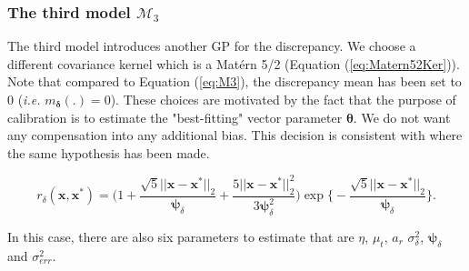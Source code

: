 \documentclass[soumission]{jsfds}
\begin{document}
\subsubsection{The third model $\mathcal{M}_3$}

The third model introduces another GP for the discrepancy. We choose a different covariance kernel which is a Matérn 5/2 (Equation (\ref{eq:Matern52Ker})).
Note that compared to Equation (\ref{eq:M3}), the discrepancy mean has been set to $0$ (\textit{i.e.} $m_{\boldsymbol{\delta}}(.)=0$). These choices are motivated by the fact that the purpose of calibration is to estimate the "best-fitting" 
vector parameter $\boldsymbol{\theta}$. We do not want any compensation into any additional bias. This decision is consistent with \citet{bachoc2014} where the same hypothesis has been made.




\begin{equation}
r_{\delta}(\boldsymbol{x},\boldsymbol{x}^*)= \Big(1+\frac{\sqrt{5}||\boldsymbol{x}-\boldsymbol{x}^*||_2}{\boldsymbol{\psi}_{\delta}}+\frac{5||\boldsymbol{x}-\boldsymbol{x}^*||_2^2}{3\boldsymbol{\psi}_{\delta}^2}\Big)\exp\Big\{-\frac{\sqrt{5}||\boldsymbol{x}-\boldsymbol{x}^*||_2}{\boldsymbol{\psi}_{\delta}}\Big\}.
\label{eq:Matern52Ker}
\end{equation}

In this case, there are also six parameters to estimate that are $\eta$, $\mu_t$, $a_r$ $\sigma_{\delta}^2$, $\boldsymbol{\psi}_{\delta}$ and $\sigma_{err}^2$.
\end{document}
